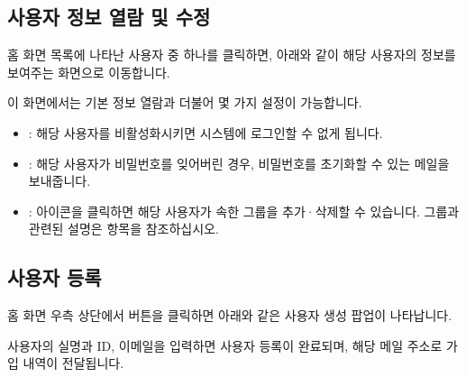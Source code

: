 \documentclass[letterpaper,10pt,english]{sphinxmanual}
\begin{document}
\subsection{사용자 정보 열람 및 수정}
\label{\detokenize{discovery/part08/members:id3}}
홈 화면 목록에 나타난 사용자 중 하나를 클릭하면, 아래와 같이 해당 사용자의 정보를 보여주는 화면으로 이동합니다.
\begin{quote}

\begin{figure}[H]
\centering

\noindent{}
\end{figure}
\end{quote}

이 화면에서는 기본 정보 열람과 더불어 몇 가지 설정이 가능합니다.
\begin{itemize}
\item {} 
: 해당 사용자를 비활성화시키면 시스템에 로그인할 수 없게 됩니다.

\item {} 
: 해당 사용자가 비밀번호를 잊어버린 경우, 비밀번호를 초기화할 수 있는 메일을 보내줍니다.

\item {} 
:  아이콘을 클릭하면 해당 사용자가 속한 그룹을 추가·삭제할 수 있습니다. 그룹과 관련된 설명은 {\hyperref[\detokenize{discovery/part08/groups:user-groups}]{}} 항목을 참조하십시오.

\end{itemize}


\subsection{사용자 등록}
\label{\detokenize{discovery/part08/members:user-registration}}\label{\detokenize{discovery/part08/members:id4}}
홈 화면 우측 상단에서  버튼을 클릭하면 아래와 같은 사용자 생성 팝업이 나타납니다.
\begin{quote}

\begin{figure}[H]
\centering

\noindent{}
\end{figure}
\end{quote}

사용자의 실명과 ID, 이메일을 입력하면 사용자 등록이 완료되며, 해당 메일 주소로 가입 내역이 전달됩니다.
\end{document}
